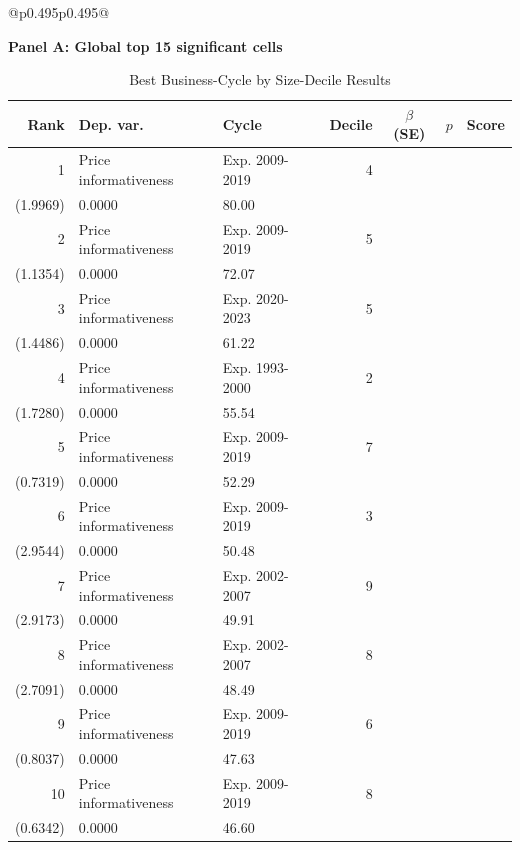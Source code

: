 \begin{table}[!htbp]\centering
\caption{Best Business-Cycle by Size-Decile Results}
\label{tab:cycle_size_best_results}
\begin{threeparttable}
\footnotesize
\setlength{\tabcolsep}{2.4pt}
\renewcommand{\arraystretch}{0.98}
\noindent\begin{tabular}{@{}p{0.495\textwidth}p{0.495\textwidth}@{}}
\parbox[t]{\linewidth}{
\centering
\textbf{Panel A: Global top 15 significant cells}
\par\vspace{0.25em}
\scriptsize
\setlength{\tabcolsep}{2.1pt}
\renewcommand{\arraystretch}{0.95}
\begin{tabular}{@{}rllrccc@{}}
\toprule
Rank & Dep. var. & Cycle & Decile & $\beta$ (SE) & $p$ & Score \\
\midrule
1 & Price informativeness & Exp. 2009-2019 & 4 & \shortstack{-18.0537***\\(1.9969)} & 0.0000 & 80.00 \\
2 & Price informativeness & Exp. 2009-2019 & 5 & \shortstack{-8.9452***\\(1.1354)} & 0.0000 & 72.07 \\
3 & Price informativeness & Exp. 2020-2023 & 5 & \shortstack{-11.0855***\\(1.4486)} & 0.0000 & 61.22 \\
4 & Price informativeness & Exp. 1993-2000 & 2 & \shortstack{-19.0526***\\(1.7280)} & 0.0000 & 55.54 \\
5 & Price informativeness & Exp. 2009-2019 & 7 & \shortstack{-4.0113***\\(0.7319)} & 0.0000 & 52.29 \\
6 & Price informativeness & Exp. 2009-2019 & 3 & \shortstack{-18.5138***\\(2.9544)} & 0.0000 & 50.48 \\
7 & Price informativeness & Exp. 2002-2007 & 9 & \shortstack{-16.3989***\\(2.9173)} & 0.0000 & 49.91 \\
8 & Price informativeness & Exp. 2002-2007 & 8 & \shortstack{-14.5853***\\(2.7091)} & 0.0000 & 48.49 \\
9 & Price informativeness & Exp. 2009-2019 & 6 & \shortstack{-4.1061***\\(0.8037)} & 0.0000 & 47.63 \\
10 & Price informativeness & Exp. 2009-2019 & 8 & \shortstack{-3.0247***\\(0.6342)} & 0.0000 & 46.60 \\

\end{tabular}}
\end{tabular}
\end{threeparttable}
\end{table}
